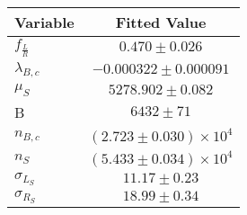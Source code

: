 \begin{tabular}[t]{lc}
\hline
Variable &Fitted Value\\
\hline\hline
$f_{\frac{L}{R}}$&$0.470\pm0.026$\\
\hline
$\lambda_{B,c}$&$-0.000322\pm0.000091$\\
\hline
$\mu_S$&$5278.902\pm0.082$\\
\hline
B&$6432\pm71$\\
\hline
$n_{B,c}$&$(2.723\pm0.030)\times 10^4$\\
\hline
$n_S$&$(5.433\pm0.034)\times 10^4$\\
\hline
$\sigma_{L_S}$&$11.17\pm0.23$\\
\hline
$\sigma_{R_S}$&$18.99\pm0.34$\\
\hline
\end{tabular}